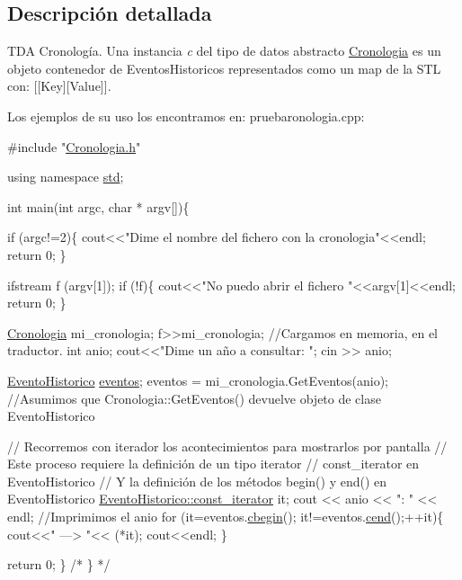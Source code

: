 \subsection{Descripción detallada}
T\+DA Cronología. Una instancia {\itshape c} del tipo de datos abstracto {\ttfamily \hyperlink{classCronologia}{Cronologia}} es un objeto contenedor de Eventos\+Historicos representados como un map de la S\+TL con\+: \mbox{[}\mbox{[}Key\mbox{]}\mbox{[}Value\mbox{]}\mbox{]}. 

Los ejemplos de su uso los encontramos en\+: pruebaronologia.\+cpp\+: 
\begin{DoxyCodeInclude}

\textcolor{preprocessor}{#include "\hyperlink{Cronologia_8h}{Cronologia.h}"}

\textcolor{keyword}{using namespace }\hyperlink{namespacestd}{std};

\textcolor{keywordtype}{int} main(\textcolor{keywordtype}{int} argc, \textcolor{keywordtype}{char} * argv[])\{

  \textcolor{keywordflow}{if} (argc!=2)\{
      cout<<\textcolor{stringliteral}{"Dime el nombre del fichero con la cronologia"}<<endl;
      \textcolor{keywordflow}{return} 0;
   \}

   ifstream f (argv[1]);
   \textcolor{keywordflow}{if} (!f)\{
    cout<<\textcolor{stringliteral}{"No puedo abrir el fichero "}<<argv[1]<<endl;
    \textcolor{keywordflow}{return} 0;
   \}

   \hyperlink{classCronologia}{Cronologia} mi\_cronologia;
   f>>mi\_cronologia; \textcolor{comment}{//Cargamos en memoria, en el traductor.}
   \textcolor{keywordtype}{int} anio;
   cout<<\textcolor{stringliteral}{"Dime un año a consultar: "};
   cin >> anio;

   \hyperlink{classEventoHistorico}{EventoHistorico} \hyperlink{classEventoHistorico_a6abe942b12ab22f551062d7ee9e9e02d}{eventos};
   eventos = mi\_cronologia.GetEventos(anio);  \textcolor{comment}{//Asumimos que Cronologia::GetEventos() devuelve objeto de
       clase EventoHistorico}

   \textcolor{comment}{// Recorremos con iterador los acontecimientos para mostrarlos por pantalla}
   \textcolor{comment}{// Este proceso requiere la definición de un tipo iterator}
   \textcolor{comment}{// const\_iterator en EventoHistorico}
   \textcolor{comment}{// Y la definición de los métodos begin() y end() en EventoHistorico}
   \hyperlink{classEventoHistorico_1_1const__iterator}{EventoHistorico::const\_iterator} it;
   cout << anio << \textcolor{stringliteral}{": "} << endl;              \textcolor{comment}{//Imprimimos el anio}
   \textcolor{keywordflow}{for} (it=eventos.\hyperlink{classEventoHistorico_a78a3ad0944311039c814e0b212e68929}{cbegin}(); it!=eventos.\hyperlink{classEventoHistorico_ab217a30a72652cabb431d7b50c9904e9}{cend}();++it)\{
     cout<<\textcolor{stringliteral}{" ---> "}<< (*it);
     cout<<endl;
   \}

   \textcolor{keywordflow}{return} 0;
\}
\textcolor{comment}{/*}
\textcolor{comment}{ \}   */}
\end{DoxyCodeInclude}
